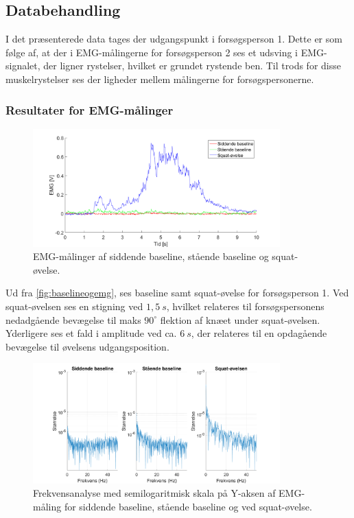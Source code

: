\subsection{Databehandling}
I det præsenterede data tages der udgangspunkt i forsøgsperson 1. Dette er som følge af, at der i EMG-målingerne for forsøgsperson 2 ses et udsving i EMG-signalet, der ligner rystelser, hvilket er grundet rystende ben. Til trods for disse muskelrystelser ses der ligheder mellem målingerne for forsøgspersonerne. 

\subsubsection{Resultater for EMG-målinger}

\begin{figure}[H]
	\centering
	\includegraphics[width=0.85\textwidth]{figures/Pilotforsoeg/baselineogemg.png}
	\caption{EMG-målinger af siddende baseline, stående baseline og squat-øvelse.}
	\label{fig:baselineogemg}
\end{figure}
Ud fra \autoref{fig:baselineogemg}, ses baseline samt squat-øvelse for forsøgsperson 1. Ved squat-øvelsen ses en stigning ved $1,5~s$, hvilket relateres til forsøgspersonens nedadgående bevægelse til maks $90^{\circ}$ flektion af knæet under squat-øvelsen. Yderligere ses et fald i amplitude ved ca. $6~s$, der relateres til en opdagående bevægelse til øvelsens udgangsposition. 


\begin{figure}[H]
	\centering
	\includegraphics[width=0.85\textwidth]{figures/Pilotforsoeg/emgfft.png}
	\caption{Frekvensanalyse med semilogaritmisk skala på Y-aksen af EMG-måling for siddende baseline, stående baseline og ved squat-øvelse.}
	\label{fig:emgfft}
\end{figure}

